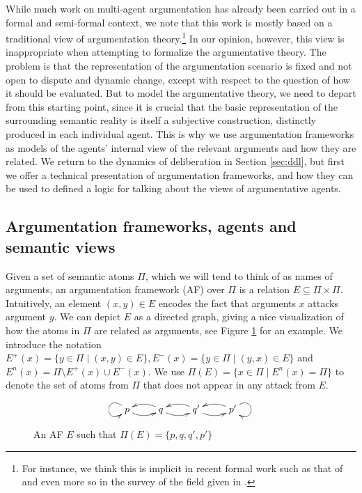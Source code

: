 \documentclass[greybox]{svmult}
\newcommand{\outa}[2]{#1^+(#2)}
\newcommand{\ina}[2]{#1^-(#2)}
\newcommand{\neu}[2]{#1^n(#2)}
\begin{document}
While much work on multi-agent argumentation has already been carried out in a formal and semi-formal context, we note that this work is mostly based on a traditional view of argumentation theory.\footnote{For instance, we think this is implicit in recent formal work such as that of \cite{pigozzi,pigozzi1} and even more so in the survey of the field given in \cite{rahwan}.} In our opinion, however, this view is inappropriate when attempting to formalize the argumentative theory. The problem is that the representation of the argumentation scenario is fixed and not open to dispute and dynamic change, except with respect to the question of how it should be evaluated. But to model the argumentative theory, we need to depart from this starting point, since it is crucial that the basic representation of the surrounding semantic reality is itself a subjective construction, distinctly produced in each individual agent. This is why we use argumentation frameworks as models of the agents' internal view of the relevant arguments and how they are related. We return to the dynamics of deliberation in Section \ref{sec:ddl}, but first we offer a technical presentation of argumentation frameworks, and how they can be used to defined a logic for talking about the views of argumentative agents.

\subsection{Argumentation frameworks, agents and semantic views}\label{subsec:arg}

Given a set of semantic atoms $\Pi$, which we will tend to think of as names of arguments, an argumentation framework (AF) over $\Pi$ is a relation $E \subseteq \Pi \times \Pi$. Intuitively, an element $(x,y) \in E$ encodes the fact that arguments $x$ attacks argument $y$. We can depict $E$ as a directed graph, giving a nice visualization of how the atoms in $\Pi$ are related as arguments, see Figure \ref{fig:1} for an example. 
We introduce the notation $\outa E x = \{y \in \Pi \mid (x,y) \in E\}, \ina E x = \{y \in \Pi \mid (y,x) \in E\}$ and $\neu E x = \Pi \setminus \outa E x \cup \ina E x$. We use $\Pi(E) = \{x \in \Pi \mid \neu E x = \Pi\}$ to denote the set of atoms from $\Pi$ that does not appear in any attack from $E$.

\begin{figure}
$$
\xymatrix{p \ar@(lu,ld) \ar@/_/[r] & q \ar@/_/[l] \ar@/_/[r] & q' \ar@/_/[l] \ar@/_/[r] & p' \ar@(ru,rd) \ar@/_/[l] }
$$
\caption{An AF $E$ such that $\Pi(E) = \{p,q,q',p'\}$}
\label{fig:1}
\end{figure}
\end{document}
